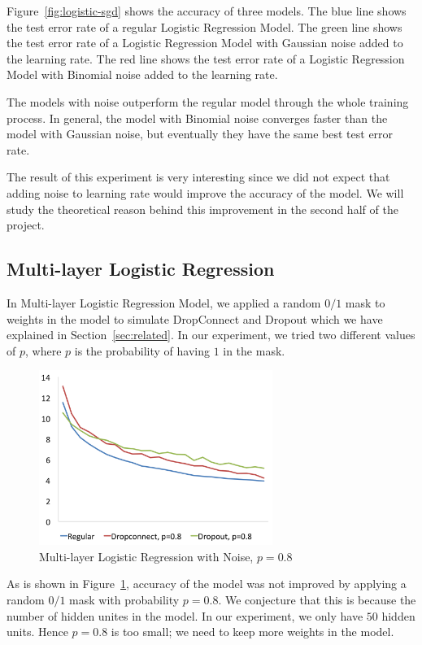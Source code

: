 Figure~\ref{fig:logistic-sgd} shows the accuracy of three models.
The blue line shows the test error rate of a regular Logistic Regression
Model.  The green line shows the test error rate of a Logistic Regression
Model with Gaussian noise added to the learning rate.  The red line shows
the test error rate of a Logistic Regression Model with Binomial noise
added to the learning rate.

The models with noise outperform the regular model through the whole
training process.  In general, the model with Binomial noise converges
faster than the model with Gaussian noise, but eventually they have the
same best test error rate.

The result of this experiment is very interesting since we did not
expect that adding noise to learning rate would improve the accuracy
of the model. We will study the theoretical reason behind this improvement
in the second half of the project.

\subsection{Multi-layer Logistic Regression}
In Multi-layer Logistic Regression Model, we applied a random $0/1$ mask to
weights in the model to simulate DropConnect and Dropout which we have explained
in Section~\ref{sec:related}.
In our experiment, we tried two different values of $p$, where $p$ is
the probability of having $1$ in the mask.

\begin{figure}[h]
\centering
\includegraphics[width=215pt]{figs/mlp_psmall.png}
\caption{Multi-layer Logistic Regression with Noise, $p=0.8$}
\label{fig:mlp-noise-psmall}
\end{figure}

As is shown in Figure~\ref{fig:mlp-noise-psmall}, accuracy of the model was not
improved by applying a random $0/1$ mask with probability $p=0.8$.
We conjecture that this is because the number of hidden unites in the
model. In our experiment, we only have $50$ hidden units. Hence $p=0.8$ is
too small; we need to keep more weights in the model.

